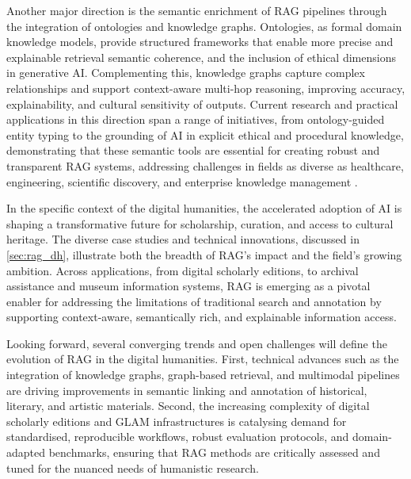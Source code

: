 \begin{spacing}{1.5}
Another major direction is the semantic enrichment of RAG pipelines through the integration of ontologies and knowledge graphs. Ontologies, as formal domain knowledge models, provide structured frameworks that enable more precise and explainable retrieval semantic coherence, and the inclusion of ethical dimensions in generative AI. Complementing this, knowledge graphs capture complex relationships and support context-aware multi-hop reasoning, improving accuracy, explainability, and cultural sensitivity of outputs. Current research and practical applications in this direction span a range of initiatives, from ontology-guided entity typing to the grounding of AI in explicit ethical and procedural knowledge, demonstrating that these semantic tools are essential for creating robust and transparent RAG systems, addressing challenges in fields as diverse as healthcare, engineering, scientific discovery, and enterprise knowledge management \citep{tiwari_ontorag_2025, ludwig_ontology-based_2025, bran_ontology-retrieval_2024, sharma_og-rag_2024, xiao_orag_2024, park_ontology-based_2024, debellis_integrating_2024,franco_ontology-based_2020}.

In the specific context of the digital humanities, the accelerated adoption of AI is shaping a transformative future for scholarship, curation, and access to cultural heritage. The diverse case studies and technical innovations, discussed in \autoref{sec:rag_dh}, illustrate both the breadth of RAG’s impact and the field’s growing ambition. Across applications, from digital scholarly editions, to archival assistance and museum information systems, RAG is emerging as a pivotal enabler for addressing the limitations of traditional search and annotation by supporting context-aware, semantically rich, and explainable information access.

Looking forward, several converging trends and open challenges will define the evolution of RAG in the digital humanities. First, technical advances such as the integration of knowledge graphs, graph-based retrieval, and multimodal pipelines are driving improvements in semantic linking and annotation of historical, literary, and artistic materials. Second, the increasing complexity of digital scholarly editions and GLAM infrastructures is catalysing demand for standardised, reproducible workflows, robust evaluation protocols, and domain-adapted benchmarks, ensuring that RAG methods are critically assessed and tuned for the nuanced needs of humanistic research.


\end{spacing}
